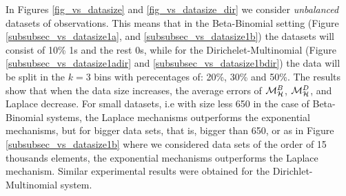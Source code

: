 \documentclass[sigconf]{acmart}
\begin{document}
In Figures \ref{fig_vs_datasize} and \ref{fig_vs_datasize_dir} we consider \emph{unbalanced} datasets
of observations. This means that in the Beta-Binomial setting (Figure \ref{subsubsec_vs_datasize1a},
and \ref{subsubsec_vs_datasize1b}) the datasets will consist of 10\% 1s and the rest 0s, while for the
Dirichelet-Multinomial (Figure  \ref{subsubsec_vs_datasize1adir} and \ref{subsubsec_vs_datasize1bdir})
the data will be split in the $k=3$ bins with perecentages of: 20\%, 30\% and 50\%.
The results show that when the data size
increases, the average errors of
$\mathcal{M}^{B}_{\mathcal{H}}$, $\mathcal{M}^{D}_{\mathcal{H}}$, and Laplace decrease. For small datasets,
i.e with size less 650 in the case of Beta-Binomial systems,
the Laplace mechanisms outperforms the exponential mechanisms,
but for bigger data sets, that is, bigger than 650, or as in Figure \ref{subsubsec_vs_datasize1b} where
we considered data sets of the order of 15 thousands elements,
the exponential mechanisms outperforms the Laplace mechanism.
Similar experimental results were obtained for the Dirichlet-Multinomial system.






\end{document}
